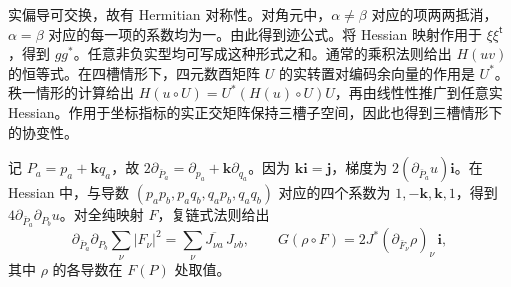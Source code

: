 实偏导可交换，故有 Hermitian 对称性。对角元中，$\alpha\ne\beta$ 对应的项两两抵消，$\alpha=\beta$ 对应的每一项的系数均为一。由此得到迹公式。将 Hessian 映射作用于 $\xi\xi^{\mathsf t}$，得到 $gg^*$。任意非负实型均可写成这种形式之和。通常的乘积法则给出 $H(uv)$ 的恒等式。在四槽情形下，四元数酉矩阵 $U$ 的实转置对编码余向量的作用是 $U^*$。秩一情形的计算给出 $H(u\circ U)=U^*(H(u)\circ U)U$，再由线性性推广到任意实 Hessian。作用于坐标指标的实正交矩阵保持三槽子空间，因此也得到三槽情形下的协变性。

记 $P_a=p_a+\mathbf k q_a$，故 $2\partial_{\bar P_a}=\partial_{p_a}+\mathbf k\partial_{q_a}$。因为 $\mathbf{ki}=\mathbf j$，梯度为 $2(\partial_{\bar P_a}u)\mathbf i$。在 Hessian 中，与导数 $(p_ap_b,p_aq_b,q_ap_b,q_aq_b)$ 对应的四个系数为 $1,-\mathbf k,\mathbf k,1$，得到 $4\partial_{\bar P_a}\partial_{P_b}u$。对全纯映射 $F$，复链式法则给出
\[
\partial_{\bar P_a}\partial_{P_b}\sum_\nu|F_\nu|^2
 =\sum_\nu\overline{J_{\nu a}}\,J_{\nu b},\qquad
G(\rho\circ F)=2J^*(\partial_{\bar F_\nu}\rho)_\nu\,\mathbf i,
\]
其中 $\rho$ 的各导数在 $F(P)$ 处取值。
